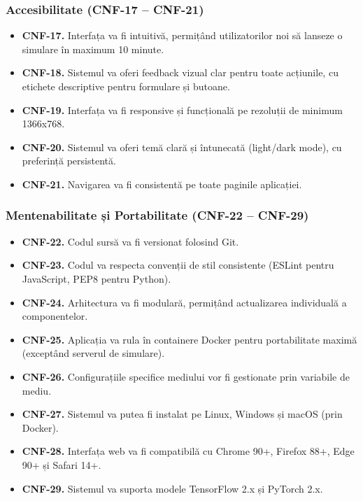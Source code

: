 \documentclass[../../main.tex]{subfiles}
\begin{document}
        \subsubsection{Accesibilitate (CNF-17 -- CNF-21)}

        \begin{itemize}
            \item \textbf{CNF-17.} Interfața va fi intuitivă, permițând utilizatorilor noi să lanseze o simulare în maximum 10 minute.
            \item \textbf{CNF-18.} Sistemul va oferi feedback vizual clar pentru toate acțiunile, cu etichete descriptive pentru formulare și butoane.
            \item \textbf{CNF-19.} Interfața va fi responsive și funcțională pe rezoluții de minimum 1366x768.
            \item \textbf{CNF-20.} Sistemul va oferi temă clară și întunecată (light/dark mode), cu preferință persistentă.
            \item \textbf{CNF-21.} Navigarea va fi consistentă pe toate paginile aplicației.
        \end{itemize}

        \subsubsection{Mentenabilitate și Portabilitate (CNF-22 -- CNF-29)}

        \begin{itemize}
            \item \textbf{CNF-22.} Codul sursă va fi versionat folosind Git.
            \item \textbf{CNF-23.} Codul va respecta convenții de stil consistente (ESLint pentru JavaScript, PEP8 pentru Python).
            \item \textbf{CNF-24.} Arhitectura va fi modulară, permițând actualizarea individuală a componentelor.
            \item \textbf{CNF-25.} Aplicația va rula în containere Docker pentru portabilitate maximă (exceptând serverul de simulare).
            \item \textbf{CNF-26.} Configurațiile specifice mediului vor fi gestionate prin variabile de mediu.
            \item \textbf{CNF-27.} Sistemul va putea fi instalat pe Linux, Windows și macOS (prin Docker).
            \item \textbf{CNF-28.} Interfața web va fi compatibilă cu Chrome 90+, Firefox 88+, Edge 90+ și Safari 14+.
            \item \textbf{CNF-29.} Sistemul va suporta modele TensorFlow 2.x și PyTorch 2.x.
        \end{itemize}
\end{document}
